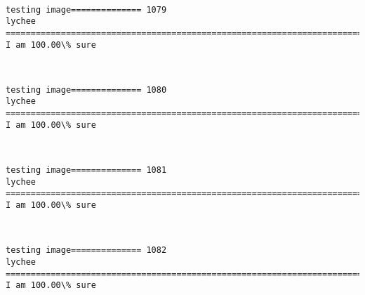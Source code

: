 \documentclass[11pt]{article}
\begin{document}
    \begin{center}
    \end{center}
    { \hspace*{\fill} \\}
    
    \begin{Verbatim}[commandchars=\\\{\}]
testing image============== 1079
lychee
============================================================================
I am 100.00\% sure

    \end{Verbatim}

    \begin{center}
    \end{center}
    { \hspace*{\fill} \\}
    
    \begin{Verbatim}[commandchars=\\\{\}]
testing image============== 1080
lychee
============================================================================
I am 100.00\% sure

    \end{Verbatim}

    \begin{center}
    \end{center}
    { \hspace*{\fill} \\}
    
    \begin{Verbatim}[commandchars=\\\{\}]
testing image============== 1081
lychee
============================================================================
I am 100.00\% sure

    \end{Verbatim}

    \begin{center}
    \end{center}
    { \hspace*{\fill} \\}
    
    \begin{Verbatim}[commandchars=\\\{\}]
testing image============== 1082
lychee
============================================================================
I am 100.00\% sure

    \end{Verbatim}
\end{document}
